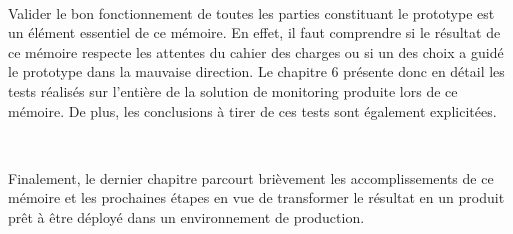 ~

\noindent
Valider le bon fonctionnement de toutes les parties constituant le prototype est un élément essentiel de ce mémoire. En effet, il faut comprendre si le résultat de ce mémoire respecte les attentes du cahier des charges ou si un des choix a guidé le prototype dans la mauvaise direction. Le chapitre 6 présente donc en détail les tests réalisés sur l'entière de la solution de monitoring produite lors de ce mémoire. De plus, les conclusions à tirer de ces tests sont également explicitées.

~

\noindent
Finalement, le dernier chapitre parcourt brièvement les accomplissements de ce mémoire et les prochaines étapes en vue de transformer le résultat en un produit prêt à être déployé dans un environnement de production.
